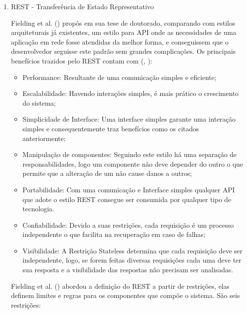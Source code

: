 \begin{enumerate}
  \item REST - Transferência de Estado Representativo
  
  Fielding et al. (\citeyear{fielding2000rest}) propôs em sua tese de doutorado, comparando com estilos arquiteturais já existentes, um estilo para API onde as necessidades de uma aplicação em rede fosse atendidas da melhor forma, e conseguissem que o desenvolvedor seguisse este padrão sem grandes complicações. Os principais benefícios trazidos pelo REST contam com (\citeauthor{rest2018or}, \citeyear{rest2018or}):
  
  \begin{itemize}
    \item Performance: Resultante de uma comunicação simples e eficiente;
    \item Escalabilidade: Havendo interações simples, é mais prático o crescimento do sistema;
    \item Simplicidade de Interface: Uma interface simples garante uma interação simples e consequentemente traz benefícios como os citados anteriormente;
    \item Manipulação de componentes: Seguindo este estilo há uma separação de responsabilidades, logo um componente não deve depender do outro o que permite que a alteração de um não cause danos a outros;
    \item Portabilidade: Com uma comunicação e Interface simples qualquer API que adote o estilo REST consegue ser consumida por qualquer tipo de tecnologia.
    \item Confiabilidade: Devido a suas restrições, cada requisição é um processo independente o que facilita na recuperação em caso de falhas;
    \item Visibilidade: A Restrição Stateless determina que cada requisição deve ser independente, logo, se forem feitas diversas requisições cada uma deve ter sua resposta e a visibilidade das respostas não precisam ser analisadas.
  \end{itemize}
  
  Fielding et al. (\citeyear{fielding2000rest}) abordou a definição do REST a partir de restrições, elas definem limites e regras para os componentes que compõe o sistema. São seis restrições: 
  

\end{enumerate}
